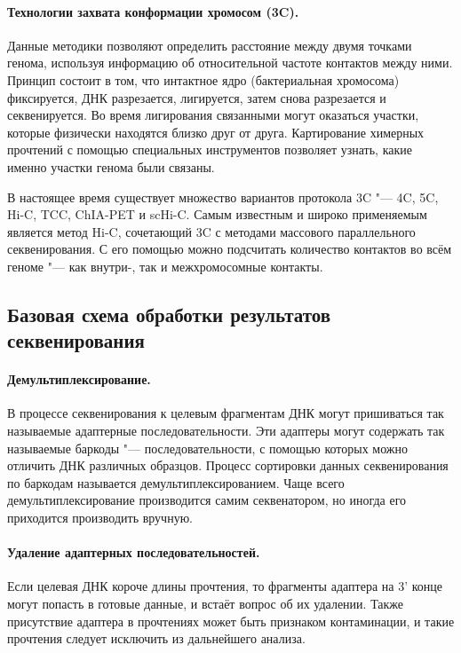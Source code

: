 \documentclass[a4paper,12pt]{article}
\begin{document}
\paragraph{Технологии захвата конформации хромосом (3C).}
Данные методики позволяют определить расстояние между двумя точками генома, используя информацию об относительной частоте контактов между ними.
Принцип состоит в том, что интактное ядро (бактериальная хромосома) фиксируется, ДНК разрезается, лигируется, затем снова разрезается и секвенируется.
Во время лигирования связанными могут оказаться участки, которые физически находятся близко друг от друга.
Картирование химерных прочтений с помощью специальных инструментов позволяет узнать, какие именно участки генома были связаны\cite{dekker}.

В настоящее время существует множество вариантов протокола 3C "--- 4C, 5C, Hi-C, TCC, ChIA-PET и scHi-C.
Самым известным и широко применяемым является метод Hi-C, сочетающий 3C с методами массового параллельного секвенирования.
С его помощью можно подсчитать количество контактов во всём геноме "--- как внутри-, так и межхромосомные контакты\cite{oluwadare}.

\subsection{Базовая схема обработки результатов секвенирования}

\paragraph{Демультиплексирование.}
В процессе секвенирования к целевым фрагментам ДНК могут пришиваться так называемые адаптерные последовательности.
Эти адаптеры могут содержать так называемые баркоды "--- последовательности, с помощью которых можно отличить ДНК различных образцов.
Процесс сортировки данных секвенирования по баркодам называется демультиплексированием.
Чаще всего демультиплексирование производится самим секвенатором, но иногда его приходится производить вручную.

\paragraph{Удаление адаптерных последовательностей.}
Если целевая ДНК короче длины прочтения, то фрагменты адаптера на 3' конце могут попасть в готовые данные, и встаёт вопрос об их удалении.
Также присутствие адаптера в прочтениях может быть признаком контаминации, и такие прочтения следует исключить из дальнейшего анализа\cite{cutadapt}.
\end{document}
